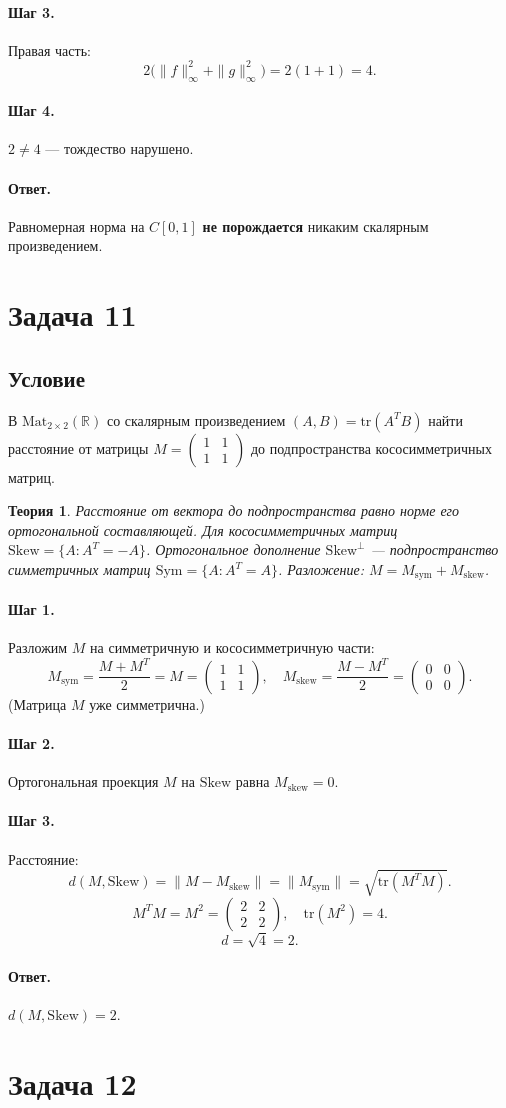\documentclass[12pt,a4paper]{article}
\theoremstyle{solution}
\newtheorem*{theory}{Теория}
\newcommand{\task}[1]{\newpage\section*{Задача #1}}
\newcommand{\answer}{\paragraph{Ответ.}}
\newcommand{\step}[1]{\paragraph{Шаг #1.}}
\newcommand{\R}{\mathbb{R}}
\newcommand{\tr}{\mathrm{tr}}
\begin{document}
\step{3} Правая часть:
\[
2\bigl(\|f\|_\infty^2+\|g\|_\infty^2\bigr)=2(1+1)=4.
\]

\step{4} $2\neq4$ --- тождество нарушено.

\answer Равномерная норма на $C[0,1]$ \textbf{не порождается} никаким скалярным произведением.

\task{11}
\subsection*{Условие}
В $\mathrm{Mat}_{2\times2}(\R)$ со скалярным произведением $(A,B)=\tr(A^TB)$ найти расстояние от матрицы $M=\begin{pmatrix}1&1\\1&1\end{pmatrix}$ до подпространства кососимметричных матриц.

\begin{theory}
Расстояние от вектора до подпространства равно норме его ортогональной составляющей. Для кососимметричных матриц $\mathrm{Skew}=\{A:A^T=-A\}$. Ортогональное дополнение $\mathrm{Skew}^\perp$ --- подпространство симметричных матриц $\mathrm{Sym}=\{A:A^T=A\}$. Разложение: $M=M_{\mathrm{sym}}+M_{\mathrm{skew}}$.
\end{theory}

\step{1} Разложим $M$ на симметричную и кососимметричную части:
\[
M_{\mathrm{sym}}=\frac{M+M^T}{2}=M=\begin{pmatrix}1&1\\1&1\end{pmatrix},\quad
M_{\mathrm{skew}}=\frac{M-M^T}{2}=\begin{pmatrix}0&0\\0&0\end{pmatrix}.
\]
(Матрица $M$ уже симметрична.)

\step{2} Ортогональная проекция $M$ на $\mathrm{Skew}$ равна $M_{\mathrm{skew}}=0$.

\step{3} Расстояние:
\[
d(M,\mathrm{Skew})=\|M-M_{\mathrm{skew}}\|=\|M_{\mathrm{sym}}\|=\sqrt{\tr(M^TM)}.
\]
\[
M^TM=M^2=\begin{pmatrix}2&2\\2&2\end{pmatrix},\quad\tr(M^2)=4.
\]
\[
d=\sqrt{4}=2.
\]

\answer $d(M,\mathrm{Skew})=2$.

\task{12}
\end{document}
